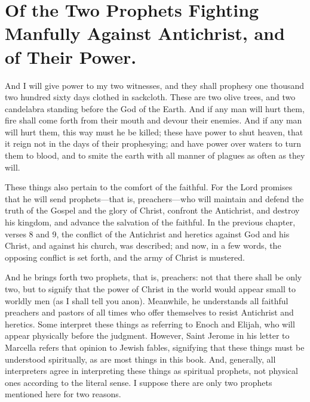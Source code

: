 \chapter[Sermon 47. Of the Two Prophets Fighting Manfully Against Antichrist, and of Their Power.]{Of the Two Prophets Fighting Manfully Against Antichrist, and of Their Power.}
\label{sermon:047}

And I will give power to my two witnesses, and they shall prophesy one thousand two hundred sixty days clothed in sackcloth. These are two olive trees, and two candelabra standing before the God of the Earth. And if any man will hurt them, fire shall come forth from their mouth and devour their enemies. And if any man will hurt them, this way must he be killed; these have power to shut heaven, that it reign not in the days of their prophesying; and have power over waters to turn them to blood, and to smite the earth with all manner of plagues as often as they will.

These things also pertain to the comfort of the faithful. For the Lord promises that he will send prophets—that is, preachers—who will maintain and defend the truth of the Gospel and the glory of Christ, confront the Antichrist, and destroy his kingdom, and advance the salvation of the faithful. In the previous chapter, verses 8 and 9, the conflict of the Antichrist and heretics against God and his Christ, and against his church, was described; and now, in a few words, the opposing conflict is set forth, and the army of Christ is mustered.

And he brings forth two prophets, that is, preachers: not that there shall be only two, but to signify that the power of Christ in the world would appear small to worldly men (as I shall tell you anon). Meanwhile, he understands all faithful preachers and pastors of all times who offer themselves to resist Antichrist and heretics. Some interpret these things as referring to Enoch and Elijah, who will appear physically before the judgment. However, Saint Jerome in his letter to Marcella refers that opinion to Jewish fables, signifying that these things must be understood spiritually, as are most things in this book. And, generally, all interpreters agree in interpreting these things as spiritual prophets, not physical ones according to the literal sense. I suppose there are only two prophets mentioned here for two reasons.

